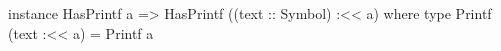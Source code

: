 \begin{code}
instance HasPrintf a
    => HasPrintf ((text :: Symbol) :<< a) where
  type Printf (text :<< a) = Printf a
\end{code}
